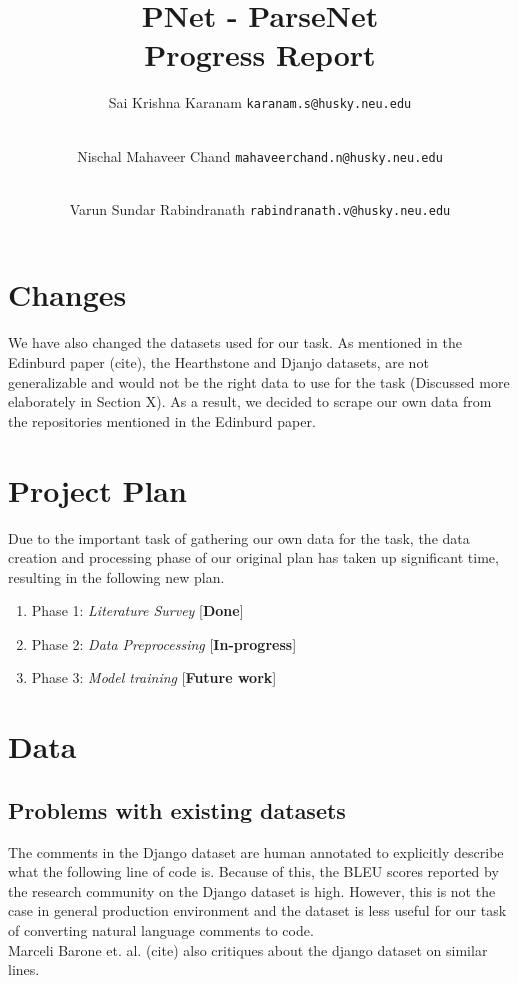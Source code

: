 \documentclass{IEEEtran}
\title{\textbf{PNet - ParseNet \\ \large{Progress Report}}}
\author{
    Sai Krishna Karanam 
    \texttt{karanam.s@husky.neu.edu}
    \and \\
    Nischal Mahaveer Chand 
    \texttt{mahaveerchand.n@husky.neu.edu}
    \and \\
    Varun Sundar Rabindranath 
    \texttt{rabindranath.v@husky.neu.edu}
}
\date{}
\begin{document}
    \maketitle

    \section{Changes}

    We have also changed the datasets used for our task. As mentioned in the 
    Edinburd paper (cite), the Hearthstone and Djanjo datasets, are not generalizable and
    would not be the right data to use for the task (Discussed more elaborately in Section
    X). As a result, we decided to scrape our own data from the repositories mentioned 
    in the Edinburd paper.

    \section{Project Plan}
    Due to the important task of gathering our own data for the task, the data creation and 
    processing phase of our original plan has taken up significant time, resulting in the
    following new plan.
    \begin{enumerate}
        \item Phase 1: \textit{Literature Survey} \hfill [\textbf{Done}]
        \item Phase 2: \textit{Data Preprocessing} \hfill [\textbf{In-progress}]
        \item Phase 3: \textit{Model training} \hfill [\textbf{Future work}]
    \end{enumerate}

    \section{Data}

      \subsection{Problems with existing datasets}
      The comments in the Django dataset are human annotated to explicitly describe what 
      the following line of code is. Because of this, the BLEU scores reported by the 
      research community on the Django dataset is high. However, this is not the case in general 
      production environment and the dataset is less useful for our task of converting natural 
      language comments to code. \\
      \hspace*{4mm}Marceli Barone et. al. (cite) also critiques about the django dataset on 
      similar lines. \\
\end{document}
